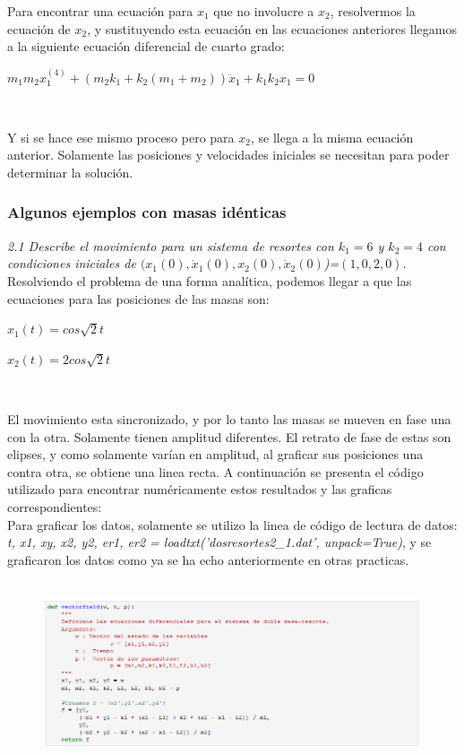 \documentclass[12pt]{article}
\begin{document}
Para encontrar una ecuación para $x_1$ que no involucre a $x_2$, resolvermos la ecuación de $x_2$, y sustituyendo esta ecuación en las ecuaciones anteriores llegamos a la siguiente ecuación diferencial de cuarto grado: \\

\centerline{$m_1m_2x_1^{(4)} + (m_2k_1 + k_2(m_1+m_2)) \ddot x_1 + k_1k_2x_1=0$}
$    $

Y si se hace ese mismo proceso pero para $x_2$, se llega a la misma ecuación anterior. Solamente las posiciones y velocidades iniciales se necesitan para poder determinar la solución. 

\subsubsection{Algunos ejemplos con masas idénticas}
\noindent \textit{2.1 Describe el movimiento para un sistema de resortes con $k_1=6$ y $k_2=4$ con condiciones iniciales de $(x_1(0), \dot x_1(0), x_2(0), \dot x_2(0)$)=$(1,0,2,0)$.}\\

Resolviendo el problema de una forma analítica, podemos llegar a que las ecuaciones para las posiciones de las masas son: \\

\centerline{$x_1(t) = cos \sqrt 2 t$}
\centerline{$x_2(t) = 2 cos \sqrt 2 t$}
$ $

El movimiento esta sincronizado, y por lo tanto las masas se mueven en fase una con la otra. Solamente tienen amplitud diferentes. El retrato de fase de estas son elipses, y como solamente varían en amplitud, al graficar sus posiciones una contra otra, se obtiene una linea recta. A continuación se presenta el código utilizado para encontrar numéricamente estos resultados y las graficas correspondientes: \\ 

Para graficar los datos, solamente se utilizo la linea de código de lectura de datos: \textit{t, x1, xy, x2, y2, er1, er2 = loadtxt('dosresortes2\_1.dat', unpack=True)}, y se graficaron los datos como ya se ha echo anteriormente en otras practicas. \\ \\  

\begin{figure}[h!]
    \centering
\includegraphics[width=6in]{Cod1.png}
\end{figure}
\end{document}
